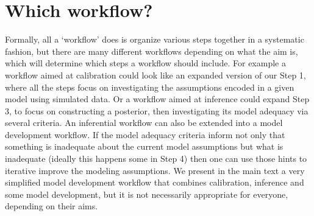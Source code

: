 \documentclass[11pt]{article}
\begin{document}

\section*{Which workflow?}

Formally, all a `workflow' does is organize various steps together in a systematic fashion, but there are many different workflows depending on what the aim is, which will determine which steps a workflow should include. For example a workflow aimed at calibration could look like an expanded version of our Step 1, where all the steps focus on investigating the assumptions encoded in a given model using simulated data. Or a workflow aimed at inference could expand Step 3, to focus on constructing a posterior, then investigating its model adequacy via several criteria. An inferential workflow can also be extended into a model development workflow.  If the model adequacy criteria inform not only that something is inadequate about the current model assumptions but what is inadequate (ideally this happens some in Step 4) then one can use those hints to iterative improve the modeling assumptions. We present in the main text a very simplified model development workflow that combines calibration, inference and some model development, but it is not necessarily appropriate for everyone, depending on their aims.

\end{document}
